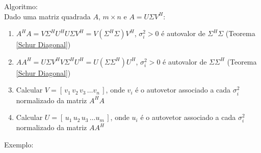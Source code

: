 \documentclass[10pt,a4paper]{article}
\begin{document}
Algoritmo:\\
Dado uma matriz quadrada $A$, $m \times n$ e $A = U\Sigma V^H$:
\begin{enumerate}
	\item $A^H A = V\Sigma^HU^HU\Sigma V^H = V(\Sigma^H\Sigma)V^H$, $\sigma^2_i > 0$ é autovalor de $\Sigma^H\Sigma$ (Teorema \ref{Schur Diagonal})
	\item $AA^H = U\Sigma V^HV\Sigma^H U^H = U(\Sigma\Sigma^H)U^H$, $\sigma^2_i > 0$ é autovalor de $\Sigma\Sigma^H$ (Teorema \ref{Schur Diagonal})
	\item Calcular $V = [ \, v_1 \, v_2 \, v_3 \, \dots v_n \, ]$, onde $v_i$ é o autovetor associado a cada $\sigma^2_i$ normalizado da matriz $A^HA$
	\item Calcular $U = [ \, u_1 \, u_2 \, u_3 \, \dots u_m \, ]$, onde $u_i$ é o autovetor associado a cada $\sigma^2_i$ normalizado da matriz $AA^H$
\end{enumerate}
Exemplo:
\end{document}
